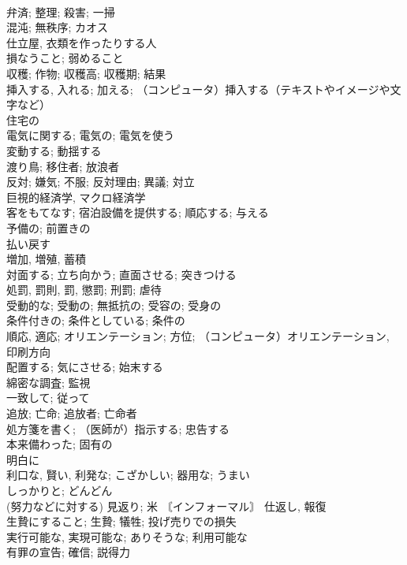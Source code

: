 \documentclass[8pt]{extreport}
\begin{document}
\begin{CJK}{UTF8}{min}
\\	弁済; 整理; 殺害; 一掃	
\\	混沌; 無秩序; カオス	
\\	仕立屋, 衣類を作ったりする人	
\\	損なうこと; 弱めること	
\\	収穫; 作物; 収穫高; 収穫期; 結果	
\\	挿入する, 入れる; 加える; （コンピュータ）挿入する（テキストやイメージや文字など）	
\\	住宅の	
\\	電気に関する; 電気の; 電気を使う	
\\	変動する; 動揺する	
\\	渡り鳥; 移住者; 放浪者	
\\	反対; 嫌気; 不服; 反対理由; 異議; 対立	
\\	巨視的経済学, マクロ経済学	
\\	客をもてなす; 宿泊設備を提供する; 順応する; 与える	
\\	予備の; 前置きの	
\\	払い戻す	
\\	増加, 増殖, 蓄積	
\\	対面する; 立ち向かう; 直面させる; 突きつける	
\\	処罰, 罰則, 罰, 懲罰; 刑罰; 虐待	
\\	受動的な; 受動の; 無抵抗の; 受容の; 受身の	
\\	条件付きの; 条件としている; 条件の	
\\	順応, 適応; オリエンテーション; 方位; （コンピュータ）オリエンテーション, 印刷方向	
\\	配置する; 気にさせる; 始末する	
\\	綿密な調査; 監視	
\\	一致して; 従って	
\\	追放; 亡命; 追放者; 亡命者	
\\	処方箋を書く; （医師が）指示する; 忠告する	
\\	本来備わった; 固有の	
\\	明白に	
\\	利口な, 賢い, 利発な; こざかしい; 器用な; うまい	
\\	しっかりと; どんどん	
\\	(努力などに対する) 見返り; 米 〘インフォーマル〙 仕返し, 報復	
\\	生贄にすること; 生贄; 犠牲; 投げ売りでの損失	
\\	実行可能な, 実現可能な; ありそうな; 利用可能な	
\\	有罪の宣告; 確信; 説得力	

\end{CJK}
\end{document}
